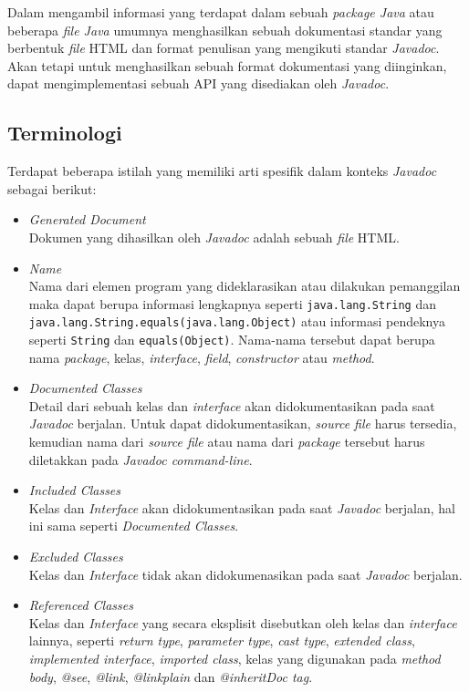 Dalam mengambil informasi yang terdapat dalam sebuah {\it package Java} atau beberapa {\it file Java} umumnya menghasilkan sebuah dokumentasi standar yang berbentuk {\it file} HTML dan format penulisan yang mengikuti standar {\it Javadoc}. Akan tetapi untuk menghasilkan sebuah format dokumentasi yang diinginkan, dapat mengimplementasi sebuah API yang disediakan oleh {\it Javadoc}.

\subsection{Terminologi}
\label{sec:terminologi}
Terdapat beberapa istilah yang memiliki arti spesifik dalam konteks {\it Javadoc} sebagai berikut:
\begin{itemize}
	\item {\it Generated Document}\\
	Dokumen yang dihasilkan oleh {\it Javadoc} adalah sebuah {\it file} HTML.
	\item {\it Name}\\
	Nama dari elemen program yang dideklarasikan atau dilakukan pemanggilan maka dapat berupa informasi lengkapnya seperti {\tt java.lang.String} dan {\tt java.lang.String.equals(java.lang.Object)} atau informasi pendeknya seperti {\tt String} dan {\tt equals(Object)}. Nama-nama tersebut dapat berupa nama {\it package}, kelas, {\it interface}, {\it field}, {\it constructor} atau {\it method}.
	\item {\it Documented Classes}\\
	Detail dari sebuah kelas dan {\it interface} akan didokumentasikan pada saat {\it Javadoc} berjalan. Untuk dapat didokumentasikan, {\it source file} harus tersedia, kemudian nama dari {\it source file} atau nama dari {\it package} tersebut harus diletakkan pada {\it Javadoc command-line}.
	\item {\it Included Classes}\\
	Kelas dan {\it Interface} akan didokumentasikan pada saat {\it Javadoc} berjalan, hal ini sama seperti {\it Documented Classes}.
	\item {\it Excluded Classes}\\
	Kelas dan {\it Interface} tidak akan didokumenasikan pada saat {\it Javadoc} berjalan.
	\item {\it Referenced Classes}\\
	Kelas dan {\it Interface} yang secara eksplisit disebutkan oleh kelas dan {\it interface} lainnya, seperti {\it return type}, {\it parameter type}, {\it cast type}, {\it extended class}, {\it implemented interface}, {\it imported class}, kelas yang digunakan pada {\it method body}, {\it @see}, {\it {@link}}, {\it {@linkplain}} dan {\it {@inheritDoc} tag}.
\end{itemize}

